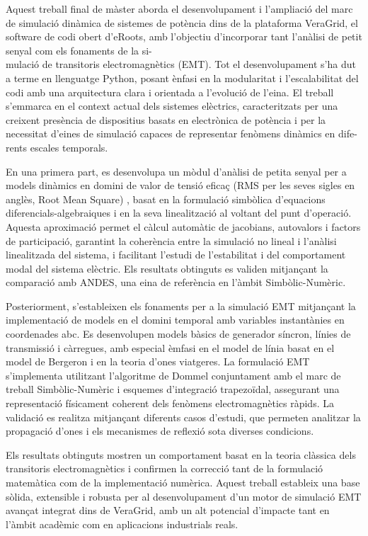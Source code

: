 Aquest treball final de màster aborda el desenvolupament i l'ampliació del marc de simulació dinàmica de sistemes de
potència dins de la plataforma VeraGrid, el software de codi obert d'eRoots, amb l'objectiu d'incorporar tant l'anàlisi de petit senyal com els fonaments 
de la si-\\mulació de transitoris electromagnètics (EMT). Tot el desenvolupament s'ha dut a terme en llenguatge Python, 
posant ènfasi en la modularitat i l'escalabilitat del codi amb una arquitectura clara i orientada a l'evolució de l'eina.
El treball s'emmarca en el context actual dels sistemes elèctrics, caracteritzats per una creixent presència de dispositius basats 
en electrònica de potència i per la necessitat d'eines de simulació capaces de representar fenòmens dinàmics en dife-\\rents escales temporals.

En una primera part, es desenvolupa un mòdul d'anàlisi de petita senyal per a models dinàmics en domini de valor de tensió eficaç (RMS per les seves sigles en anglès, Root Mean Square) , 
basat en la formulació simbòlica d'equacions diferencials-algebraiques i en la seva linealització al voltant del punt d'operació. 
Aquesta aproximació permet el càlcul automàtic de jacobians, autovalors i factors de participació, garantint la coherència entre la 
simulació no lineal i l'anàlisi linealitzada del sistema, i facilitant l'estudi de l'estabilitat i del comportament modal del sistema elèctric. 
Els resultats obtinguts es validen mitjançant la comparació amb ANDES, una eina de referència en l'àmbit Simbòlic-Numèric.

Posteriorment, s'estableixen els fonaments per a la simulació EMT mitjançant la implementació de models en el 
domini temporal amb variables instantànies en coordenades abc. Es desenvolupen models bàsics de generador síncron, 
línies de transmissió i càrregues, amb especial èmfasi en el model de línia basat en el model de Bergeron i 
en la teoria d'ones viatgeres. La formulació EMT s'implementa utilitzant l'algoritme de Dommel conjuntament amb el marc de treball Simbòlic-Numèric 
i esquemes d'integració trapezoïdal, assegurant una representació físicament coherent dels fenòmens electromagnètics ràpids. 
La validació es realitza mitjançant diferents casos d'estudi, que permeten analitzar la propagació d'ones i els mecanismes de 
reflexió sota diverses condicions.

Els resultats obtinguts mostren un comportament basat en la teoria clàssica dels transitoris electromagnètics i confirmen la 
correcció tant de la formulació matemàtica com de la implementació numèrica. Aquest treball estableix una base sòlida, extensible i robusta per al 
desenvolupament d'un motor de simulació EMT avançat integrat dins de VeraGrid, amb un alt potencial d'impacte tant en l'àmbit acadèmic com en aplicacions 
industrials reals.


